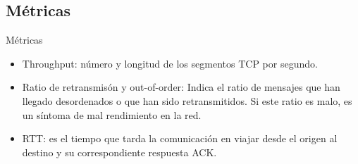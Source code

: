 \documentclass[aspectratio=149]{beamer}
\begin{document}
\subsection{Métricas}
\begin{frame}[label=metricas]{Métricas}
    \begin{itemize}
        \item Throughput: número y longitud de los segmentos TCP por segundo.
        \item Ratio de retransmisón y out-of-order: Indica el ratio de mensajes que han llegado desordenados o que han sido retransmitidos. Si este ratio es malo, es un síntoma de mal rendimiento en la red.
        \item RTT: es el tiempo que tarda la comunicación en viajar desde el origen al destino y su correspondiente respuesta ACK.
    \end{itemize}
\end{frame}
\end{document}
